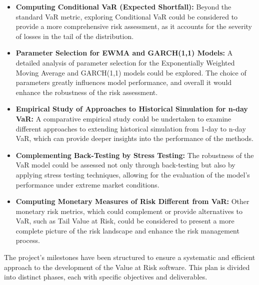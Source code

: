 \documentclass{article}
\begin{document}
\begin{itemize}
  \item \textbf{Computing Conditional VaR (Expected Shortfall):}  Beyond the standard VaR metric, exploring Conditional VaR could be considered to provide a more comprehensive risk assessment, as it accounts for the severity of losses in the tail of the distribution.

  \item \textbf{Parameter Selection for EWMA and GARCH(1,1) Models:} A detailed analysis of parameter selection for the Exponentially Weighted Moving Average and GARCH(1,1) models could be explored. The choice of parameters greatly influences model performance, and overall it would enhance the robustness of the risk assessment.
  
  \item \textbf{Empirical Study of Approaches to Historical Simulation for n-day VaR:} A comparative empirical study could be undertaken to examine different approaches to extending historical simulation from 1-day to n-day VaR, which can provide deeper insights into the performance of the methods.
  
  \item \textbf{Complementing Back-Testing by Stress Testing:} The robustness of the VaR model could be assessed not only through back-testing but also by applying stress testing techniques, allowing for the evaluation of the model's performance under extreme market conditions.
  
  \item \textbf{Computing Monetary Measures of Risk Different from VaR:} Other monetary risk metrics, which could complement or provide alternatives to VaR, such as Tail Value at Risk, could be considered to present a more complete picture of the risk landscape and enhance the risk management process.
\end{itemize}

The project's milestones have been structured to ensure a systematic and efficient approach to the development of the Value at Risk software. This plan is divided into distinct phases, each with specific objectives and deliverables.
\end{document}
